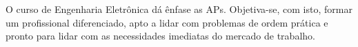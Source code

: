 


O curso de Engenharia Eletrônica dá ênfase as APs. Objetiva-se, com isto, formar um profissional diferenciado, apto a lidar com problemas de ordem prática e pronto para lidar com as necessidades imediatas do mercado de trabalho.







